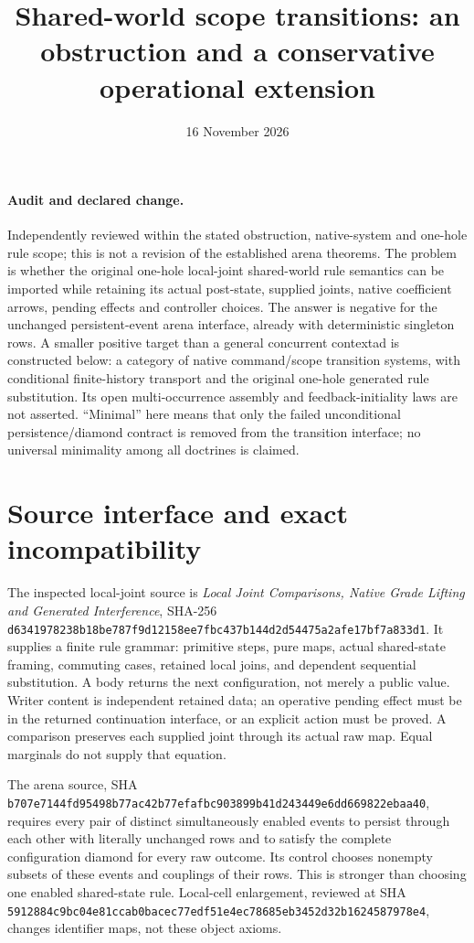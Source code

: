 \documentclass[11pt]{article}
\title{Shared-world scope transitions: an obstruction and a conservative operational extension}
\date{16 November 2026}
\begin{document}
\maketitle
\paragraph{Audit and declared change.}
Independently reviewed within the stated obstruction, native-system and one-hole rule scope; this is not a revision of the established arena theorems. The problem is whether the original one-hole local-joint shared-world rule semantics can be imported while retaining its actual post-state, supplied joints, native coefficient arrows, pending effects and controller choices. The answer is negative for the unchanged persistent-event arena interface, already with deterministic singleton rows. A smaller positive target than a general concurrent contextad is constructed below: a category of native command/scope transition systems, with conditional finite-history transport and the original one-hole generated rule substitution. Its open multi-occurrence assembly and feedback-initiality laws are not asserted. ``Minimal'' here means that only the failed unconditional persistence/diamond contract is removed from the transition interface; no universal minimality among all doctrines is claimed.

\section{Source interface and exact incompatibility}
The inspected local-joint source is \emph{Local Joint Comparisons, Native Grade Lifting and Generated Interference}, SHA-256
\texttt{d6341978238b18be787f9d12158ee7fbc437b144d2d54475a2afe17bf7a833d1}.
It supplies a finite rule grammar: primitive steps, pure maps, actual shared-state framing, commuting cases, retained local joins, and dependent sequential substitution. A body returns the next configuration, not merely a public value. Writer content is independent retained data; an operative pending effect must be in the returned continuation interface, or an explicit action must be proved. A comparison preserves each supplied joint through its actual raw map. Equal marginals do not supply that equation.

The arena source, SHA
\texttt{b707e7144fd95498b77ac42b77efafbc903899b41d243449e6dd669822ebaa40},
requires every pair of distinct simultaneously enabled events to persist through each other with literally unchanged rows and to satisfy the complete configuration diamond for every raw outcome. Its control chooses nonempty subsets of these events and couplings of their rows. This is stronger than choosing one enabled shared-state rule. Local-cell enlargement, reviewed at SHA
\texttt{5912884c9bc04e81ccab0bacec77edf51e4ec78685eb3452d32b1624587978e4},
changes identifier maps, not these object axioms.
\end{document}
